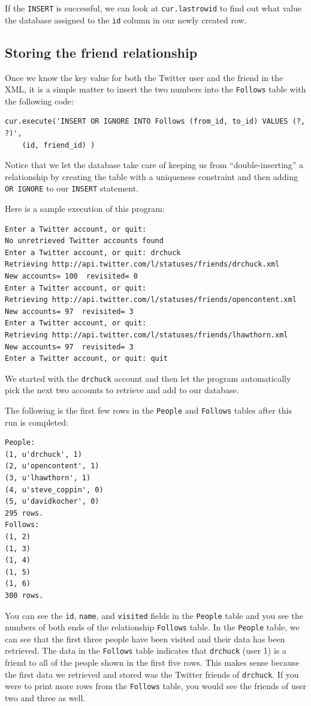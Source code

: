 \documentclass[10pt]{book}
\begin{document}
If the {\tt INSERT} is successful, we can look at {\tt cur.lastrowid} 
to find out what value the database assigned to the {\tt id} column in 
our newly created row.

\subsection{Storing the friend relationship}

Once we know the key value for both the Twitter user
and the friend in the XML, it is a simple matter to insert
the two numbers into the {\tt Follows} table
with the following code:

\beforeverb
\begin{verbatim}
cur.execute('INSERT OR IGNORE INTO Follows (from_id, to_id) VALUES (?, ?)',
    (id, friend_id) )
\end{verbatim}
\afterverb
%
Notice that we let the database take care of keeping us from ``double-inserting''
a relationship by creating the table with a uniqueness constraint and then
adding {\tt OR IGNORE} to our {\tt INSERT} statement.

Here is a sample execution of this program:
\beforeverb
\begin{verbatim}
Enter a Twitter account, or quit: 
No unretrieved Twitter accounts found
Enter a Twitter account, or quit: drchuck
Retrieving http://api.twitter.com/l/statuses/friends/drchuck.xml
New accounts= 100  revisited= 0
Enter a Twitter account, or quit: 
Retrieving http://api.twitter.com/l/statuses/friends/opencontent.xml
New accounts= 97  revisited= 3
Enter a Twitter account, or quit: 
Retrieving http://api.twitter.com/l/statuses/friends/lhawthorn.xml
New accounts= 97  revisited= 3
Enter a Twitter account, or quit: quit
\end{verbatim}
\afterverb
%
We started with the {\tt drchuck} account and then let the program
automatically pick the next two accounts to retrieve and add to 
our database.

The following is the first few rows in the {\tt People} 
and {\tt Follows} tables after this run is completed:
\beforeverb
\begin{verbatim}
People:
(1, u'drchuck', 1)
(2, u'opencontent', 1)
(3, u'lhawthorn', 1)
(4, u'steve_coppin', 0)
(5, u'davidkocher', 0)
295 rows.
Follows:
(1, 2)
(1, 3)
(1, 4)
(1, 5)
(1, 6)
300 rows.
\end{verbatim}
\afterverb
%
You can see the {\tt id}, {\tt name}, and {\tt visited} fields in the 
{\tt People} table and you see the numbers of both ends of 
the relationship {\tt Follows} table.   
In the {\tt People} table, we can see that the first three people
have been visited and their data has been retrieved.
The data in the {\tt Follows} table indicates that
{\tt drchuck} (user 1) is a friend to all of the people shown in the first
five rows.  This makes sense because
the first data we retrieved and stored was the Twitter friends of
{\tt drchuck}.  If you were to print more rows from the {\tt Follows} table,
you would see the friends of user two and three as well.
\end{document}
